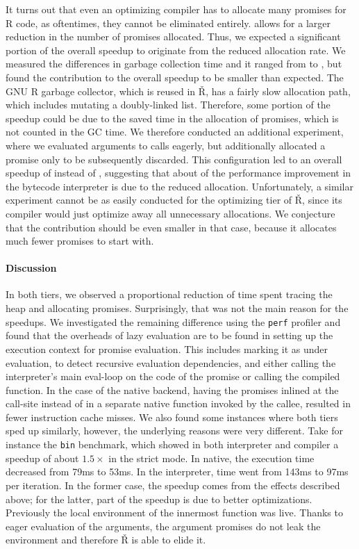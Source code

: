 \documentclass[review,creen,acmsmall]{acmart}
\renewcommand{\Rsh}{{\sf\v R}\xspace}
\begin{document}
It turns out that even an optimizing compiler has to allocate many promises for
R code, as oftentimes, they cannot be eliminated entirely. \rshstrict allows for
a larger reduction in the number of promises allocated. Thus, we expected a
significant portion of the overall speedup to originate from the reduced
allocation rate. We measured the differences in garbage collection time and it
ranged from \speedupGCRshStrictMin to \speedupGCRshStrictMax, but found the
contribution to the overall speedup to be smaller than expected. The GNU R
garbage collector, which is reused in \Rsh, has a fairly slow allocation path,
which includes mutating a doubly-linked list. Therefore, some portion of the
speedup could be due to the saved time in the allocation of promises, which is
not counted in the GC time. We therefore conducted an additional experiment,
where we evaluated arguments to calls eagerly, but additionally allocated a
promise only to be subsequently discarded. This configuration led to an overall
speedup of \speedupBCRshStrictAlloc instead of \speedupBCRshStrict, suggesting
that about \speedupDueToReducedGC of the performance improvement in the bytecode
interpreter is due to the reduced allocation. Unfortunately, a similar
experiment cannot be as easily conducted for the optimizing tier of \Rsh, since
its compiler would just optimize away all unnecessary allocations. We conjecture
that the contribution should be even smaller in that case, because it allocates
much fewer promises to start with.

\paragraph{Discussion}

In both tiers, we observed a proportional reduction of time spent tracing the
heap and allocating promises. Surprisingly, that was not the main reason
for the speedups. We investigated the remaining difference using the
\lstinline{perf} profiler and found that the overheads of lazy evaluation are to
be found in setting up the execution context for promise evaluation. This
includes marking it as under evaluation, to detect recursive evaluation dependencies,
and either calling the interpreter's main eval-loop on the code of the promise or
calling the compiled function. In the case of the native backend, having the
promises inlined at the call-site instead of in a separate native function
invoked by the callee, resulted in fewer instruction cache misses. We also found
some instances where both tiers sped up similarly, however, the underlying
reasons were very different. Take for instance the \lstinline{bin} benchmark,
which showed in both interpreter and compiler a speedup of about $1.5\times$ in
the strict mode. In native, the execution time decreased from 79ms to 53ms. In
the interpreter, time went from 143ms to 97ms per iteration. In the former case,
the speedup comes from the effects described above; for the latter, part of the
speedup is due to better optimizations. Previously the local environment of
the innermost function was live. Thanks to eager evaluation of the arguments,
the argument promises do not leak the environment and therefore \Rsh is able to
elide it.
\end{document}
